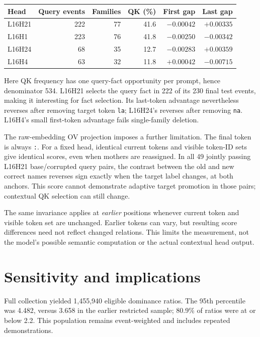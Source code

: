 \documentclass[11pt,a4paper]{article}
\begin{document}
\begin{center}
\small
\begin{tabular}{lrrrrr}
\toprule
Head & Query events & Families & QK (\%) & First gap & Last gap \\
\midrule
L16H21 & 222 & 77 & 41.6 & $-0.00042$ & $+0.00335$ \\
L16H1  & 223 & 76 & 41.8 & $-0.00250$ & $-0.00342$ \\
L16H24 & 68  & 35 & 12.7 & $-0.00283$ & $+0.00359$ \\
L16H4  & 63  & 32 & 11.8 & $+0.00042$ & $-0.00715$ \\
\bottomrule
\end{tabular}
\end{center}
Here QK frequency has one query-fact opportunity per prompt, hence denominator 534. L16H21 selects the query fact in 222 of its 230 final test events, making it interesting for fact selection. Its last-token advantage nevertheless reverses after removing target token \texttt{la}; L16H24's reverses after removing \texttt{na}. L16H4's small first-token advantage fails single-family deletion.

The raw-embedding OV projection imposes a further limitation. The final token is always \texttt{:}. For a fixed head, identical current tokens and visible token-ID sets give identical scores, even when mothers are reassigned. In all 49 jointly passing L16H21 base/corrupted query pairs, the contrast between the old and new correct names reverses sign exactly when the target label changes, at both anchors. This score cannot demonstrate adaptive target promotion in those pairs; contextual QK selection can still change.

The same invariance applies at \emph{earlier} positions whenever current token and visible token set are unchanged. Earlier tokens can vary, but resulting score differences need not reflect changed relations. This limits the measurement, not the model's possible semantic computation or the actual contextual head output.

\section{Sensitivity and implications}
Full collection yielded 1,455,940 eligible dominance ratios. The 95th percentile was 4.482, versus 3.658 in the earlier restricted sample; 80.9\% of ratios were at or below 2.2. This population remains event-weighted and includes repeated demonstrations.
\end{document}
